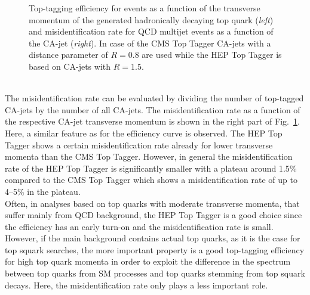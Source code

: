 \begin{description}
\begin{figure}[!t]
{\begin{tabular}{cc}
  \end{tabular}}
  \caption{Top-tagging efficiency for \ttbar events as a function of the transverse momentum of the generated hadronically decaying top quark (\textit{left}) and misidentification rate for QCD multijet events as a function of the CA-jet \pt (\textit{right}). In case of the CMS Top Tagger CA-jets with a distance parameter of $R=0.8$ are used while the HEP Top Tagger is based on CA-jets with $R=1.5$.}
  \label{fig:stop_top_eff}
\end{figure} 
\\
The misidentification rate can be evaluated by dividing the number of top-tagged CA-jets by the number of all CA-jets. The misidentification rate as a function of the respective CA-jet transverse momentum is shown in the right part of Fig.~\ref{fig:stop_top_eff}. Here, a similar feature as for the efficiency curve is observed. The HEP Top Tagger shows a certain misidentification rate already for lower transverse momenta than the CMS Top Tagger. However, in general the misidentification rate of the HEP Top Tagger is significantly smaller with a plateau around 1.5\% compared to the CMS Top Tagger which shows a misidentification rate of up to 4--5\% in the plateau. \\
Often, in analyses based on top quarks with moderate transverse momenta, that suffer mainly from QCD background, the HEP Top Tagger is a good choice since the efficiency has an early turn-on and the misidentification rate is small. However, if the main background contains actual top quarks, as it is the case for top squark searches, the more important property is a good top-tagging efficiency for high top quark momenta in order to exploit the difference in the \pt spectrum between top quarks from SM processes and top quarks stemming from top squark decays. Here, the misidentification rate only plays a less important role. 
\end{description}
